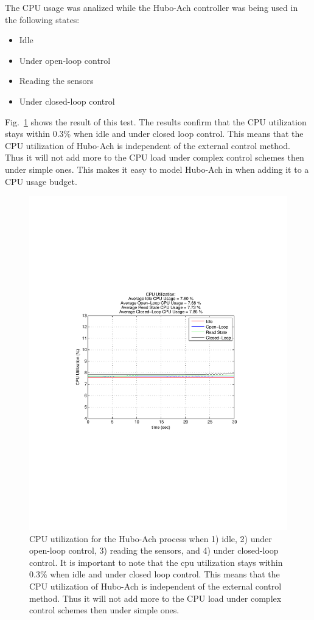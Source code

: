 The CPU usage was analized while the Hubo-Ach controller was being used in the following states:
\begin{multicols}{2}
\begin{itemize}
\item Idle
\item Under open-loop control
\item Reading the sensors
\item Under closed-loop control
\end{itemize}
\end{multicols}

Fig.~\ref{fig:timing-getTrigger} shows the result of this test.
The results confirm that the CPU utilization stays within 0.3\% when idle and under closed loop control.
This means that the CPU utilization of Hubo-Ach is independent of the external control method.
Thus it will not add more to the CPU load under complex control schemes then under simple ones.
This makes it easy to model Hubo-Ach in when adding it to a CPU usage budget.


\begin{figure}[thpb]
  \centering
\includegraphics[width=0.6\columnwidth]{./timingData/cpu.pdf}
  \caption{CPU utilization for the Hubo-Ach process when 1) idle, 2) under open-loop control, 3) reading the sensors, and 4) under closed-loop control.  
It is important to note that the cpu utilization stays within 0.3\% when idle and under closed loop control.
This means that the CPU utilization of Hubo-Ach is independent of the external control method.
Thus it will not add more to the CPU load under complex control schemes then under simple ones.}
  \label{fig:timing-getTrigger}
\end{figure}
